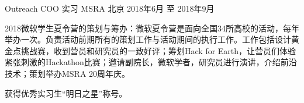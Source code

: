 

\begin{cventries}

  \cventry
    {Outreach COO 实习} %
    {MSRA} %
    {北京} %
    {2018年6月 至 2018年9月} %
    {
      \begin{cvitems} %
        \setlength\itemsep{1mm}
        \item {2018微软学生夏令营的策划与筹办：微软夏令营是面向全国34所高校的活动，每年举办一次。负责活动前期所有的策划工作与活动期间的执行工作。工作包括设计黄金点挑战赛，收到营员和研究员的一致好评；筹划Hack for Earth，让营员们体验紧张刺激的Hackathon比赛；邀请副院长，微软学者，研究员进行演讲，介绍前沿技术；策划举办MSRA 20周年庆。}
        \item {获得优秀实习生“明日之星”称号。}
      \end{cvitems}
    }


\end{cventries}
